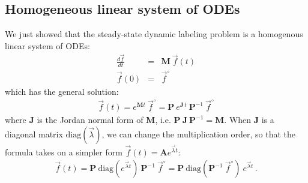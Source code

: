 \documentclass{article}
\newcommand{\finit}{\vec{f}^\circ}
\begin{document}
\subsection{Homogeneous linear system of ODEs}
We just showed that the steady-state dynamic labeling problem is a homogenous linear system of ODEs:
\begin{eqnarray}
    \frac{d\vec{f}}{d t} &=& \mathbf{M} ~ \vec{f}(t) \\
    \vec{f}(0) &=& \finit
\end{eqnarray}
which has the general solution:
\begin{eqnarray}
    \vec{f}(t) = e^{\mathbf{M} t}~\finit =  \mathbf{P}~e^{\mathbf{J}\,t}~\mathbf{P}^{-1}~\finit
\end{eqnarray}
where $\mathbf{J}$ is the Jordan normal form of $\mathbf{M}$, i.e. $\mathbf{P}~\mathbf{J}~\mathbf{P}^{-1} = \mathbf{M}$. When $\mathbf{J}$ is a diagonal matrix $\text{diag}\left(\vec{\lambda} \right)$, we can change the multiplication order, so that the formula takes on a simpler form $\vec{f}(t) = \mathbf{A} e^{\vec{\lambda} t}$:
\begin{eqnarray}\label{eq:homogenous_solution}
    \vec{f}(t) = \mathbf{P}~ \text{diag}\left(e^{\vec{\lambda} t}\right) ~\mathbf{P}^{-1}~\finit = \mathbf{P}~\text{diag}\left( \mathbf{P}^{-1} ~\finit\right)~ e^{\vec{\lambda} t}\,.
\end{eqnarray}
\end{document}
